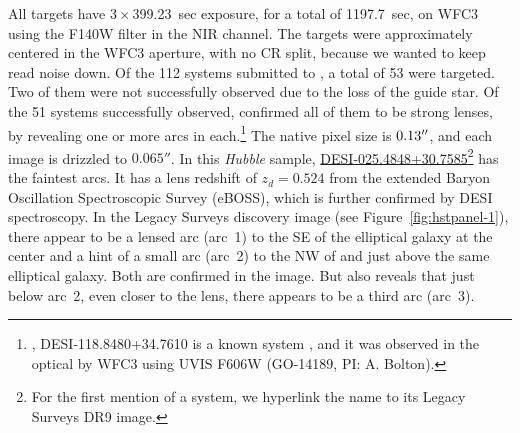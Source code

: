 All targets have $3 \times$399.23~sec exposure, 
for a total of 1197.7~sec, 
on WFC3 using the F140W filter in the NIR channel.
The targets were approximately centered in the WFC3 aperture, with no CR split, because we wanted to keep read noise down. 
Of the 112 systems submitted to \hst, 
a total of 53 were targeted. 
Two of them were not successfully observed due to the loss of the guide star.
Of the 51 systems successfully observed, \hst confirmed all of them to be strong lenses, 
by revealing one or more arcs in each.\footnote{, DESI-118.8480+34.7610 is a known system \citep[][SDSS~J0755+3445]{shu2016b}, 
and it was observed in the optical by \hst WFC3 using UVIS F606W (GO-14189, PI: A. Bolton).}
The native pixel size is $0.13^{\prime \prime}$, and each image is drizzled to $0.065''$.
In this \emph{Hubble} sample, 
\href{https://www.legacysurvey.org/viewer/?ra=025.4848&dec=+30.7585&layer=ls-dr9&pixscale=0.262&zoom=16}{DESI-025.4848+30.7585}\footnote{For the first mention of a system, we hyperlink the name to its Legacy Surveys DR9 image.}  has the faintest arcs.
It has a lens redshift of $z_d = 0.524$ from the extended Baryon Oscillation Spectroscopic Survey (eBOSS), 
which is further confirmed by DESI spectroscopy.
In the Legacy Surveys discovery image (see Figure~\ref{fig:hstpanel-1}), 
there appear to be a lensed arc (arc~1) to the SE of the elliptical galaxy at the center and a hint of a small arc (arc~2) to the NW of and just above the same elliptical galaxy.
Both are confirmed in the \hst image.
But \hst also reveals that just below arc~2, even closer to the lens, there appears to be a third arc (arc~3).
